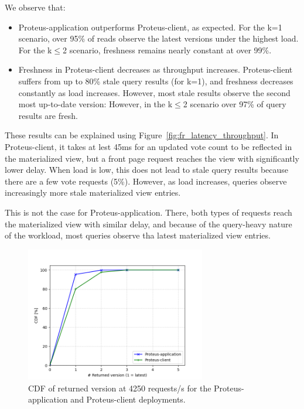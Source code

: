 We observe that:
\begin{itemize}
  \item Proteus-application outperforms Proteus-client, as expected.
  For the k=1 scenario, over 95\% of reads observe the latest versions under the highest load.
  For the k$\leq$2 scenario, freshness remains nearly constant at over 99\%.
  \item Freshness in Proteus-client decreases as throughput increases.
  Proteus-client suffers from up to 80\% stale query results (for k=1), and freshness decreases constantly as load increases.
  However, most stale results observe the second most up-to-date version:
  However, in the k$\leq$2 scenario over 97\% of query results are fresh.
\end{itemize}

These results can be explained using Figure~\ref{fig:fr_latency_throughput}.
In Proteus-client, it takes at lest 45ms for an updated vote count to be reflected in the materialized view,
but a front page request reaches the view with significantly lower delay.
When load is low, this does not lead to stale query results because there are a few vote requests (5\%).
However, as load increases, queries observe increasingly more stale materialized view  entries.

This is not the case for Proteus-application.
There, both types of requests reach the materialized view with similar delay,
and because of the query-heavy nature of the workload,
most queries observe tha latest materialized view entries.

\begin{figure}[H]
\centering
  \includegraphics[width=0.7\textwidth]{./figures/evaluation/readV_cdf_throughput.png}
  \caption{CDF of returned version at 4250 requests/s for the Proteus-application and Proteus-client deployments.}
  \label{fig:readV_cdf_throughput}
\end{figure}

